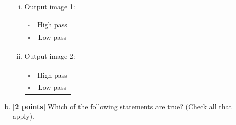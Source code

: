 \begin{enumerate}[(a)]
\begin{enumerate}[(i)]
\item
Output image 1:\\
\begin{tabular}[h]{lc}
$\square$ & High pass \\
$\square$ & Low pass \\
\end{tabular}

\item
Output image 2:\\
\begin{tabular}[h]{lc}
$\square$ & High pass \\
$\square$ & Low pass \\
\end{tabular}
\end{enumerate}

\item \textbf{[2 points]}
Which of the following statements are true? (Check all that apply).


\end{enumerate}
